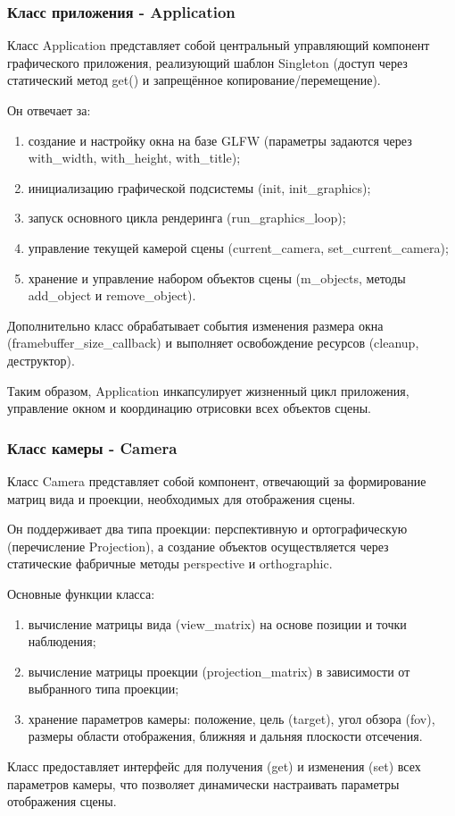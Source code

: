 \documentclass[a4paper,12pt]{article}
\begin{document}
\subsubsection* {Класс приложения - Application}

Класс Application представляет собой центральный управляющий компонент графического приложения, реализующий шаблон Singleton (доступ через статический метод get() и запрещённое копирование/перемещение).

Он отвечает за:
\begin{enumerate}
    \item создание и настройку окна на базе GLFW (параметры задаются через with\_width, with\_height, with\_title);
    \item инициализацию графической подсистемы (init, init\_graphics);
    \item запуск основного цикла рендеринга (run\_graphics\_loop);
    \item управление текущей камерой сцены (current\_camera, set\_current\_camera);
    \item хранение и управление набором объектов сцены (m\_objects, методы add\_object и remove\_object).
\end{enumerate}
Дополнительно класс обрабатывает события изменения размера окна (framebuffer\_size\_callback) и выполняет освобождение ресурсов (cleanup, деструктор).

Таким образом, Application инкапсулирует жизненный цикл приложения, управление окном и координацию отрисовки всех объектов сцены.
\newpage
\subsubsection* {Класс камеры - Camera}

Класс Camera представляет собой компонент, отвечающий за формирование матриц вида и проекции, необходимых для отображения сцены.

Он поддерживает два типа проекции: перспективную и ортографическую (перечисление Projection), а создание объектов осуществляется через статические фабричные методы perspective и orthographic.

Основные функции класса:
\begin{enumerate}
    \item вычисление матрицы вида (view\_matrix) на основе позиции и точки наблюдения;
    \item вычисление матрицы проекции (projection\_matrix) в зависимости от выбранного типа проекции;
    \item хранение параметров камеры: положение, цель (target), угол обзора (fov), размеры области отображения, ближняя и дальняя плоскости отсечения.
\end{enumerate}
Класс предоставляет интерфейс для получения (get) и изменения (set) всех параметров камеры, что позволяет динамически настраивать параметры отображения сцены.
\end{document}
